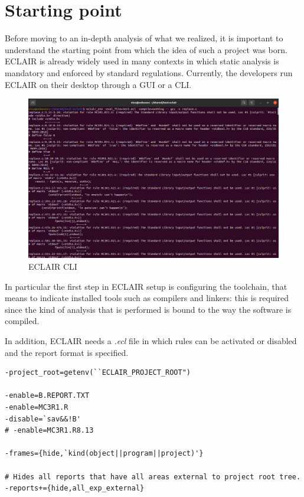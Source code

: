 \chapter{Starting point}\label{chapter:starting-point}
Before moving to an in-depth analysis of what we realized, it is important to understand the starting point from which the idea of such a project was born.
ECLAIR is already widely used in many contexts in which static analysis is mandatory and enforced by standard regulations. Currently, the developers run ECLAIR on their desktop through a GUI or a CLI. 
\begin{figure}[ht]
	\centering
	\includegraphics[width=1\textwidth]{Immagini/eclair_cli.jpg}
	\caption{ECLAIR CLI}
	\label{fig:one}
\end{figure}

In particular the first step in ECLAIR setup is configuring the toolchain, that means to indicate installed tools such as compilers and linkers: this is required since the kind of analysis that is performed is bound to the way the software is compiled. 

In addition, ECLAIR needs a \emph{.ecl} file in which rules can be activated or disabled and the report format is specified. 

\begin{lstlisting}[caption={Example \emph{.ecl} file}, label={lst:block_struct}]
-project_root=getenv(``ECLAIR_PROJECT_ROOT")

-enable=B.REPORT.TXT
-enable=MC3R1.R
-disable=`sav&&!B'
# -enable=MC3R1.R8.13

-frames={hide,`kind(object||program||project)'}

# Hides all reports that have all areas external to project root tree.
-reports+={hide,all_exp_external}
\end{lstlisting}

